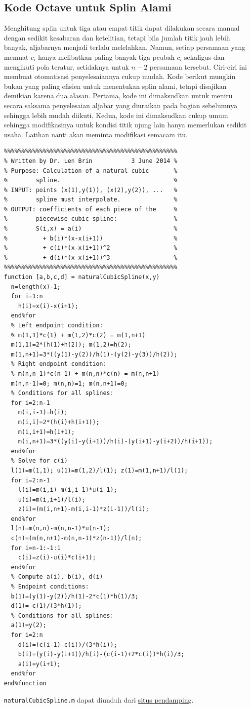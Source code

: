 \subsection{Kode Octave untuk Splin Alami}

Menghitung splin untuk tiga atau empat titik dapat dilakukan secara
manual dengan sedikit kesabaran dan ketelitian, tetapi bila jumlah
titik jauh lebih banyak, aljabarnya menjadi terlalu melelahkan. Namun,
setiap persamaan yang memuat $c_{i}$ hanya melibatkan paling banyak
tiga peubah $c_{i}$ sekaligus dan mengikuti pola teratur, setidaknya
untuk $n-2$ persamaan tersebut. Ciri-ciri ini membuat otomatisasi
penyelesaiannya cukup mudah. Kode berikut mungkin bukan yang paling
efisien untuk menentukan splin alami, tetapi disajikan demikian karena
dua alasan. Pertama, kode ini dimaksudkan untuk meniru secara saksama
penyelesaian aljabar yang diuraikan pada bagian sebelumnya sehingga
lebih mudah diikuti. Kedua, kode ini dimaksudkan cukup umum sehingga
modifikasinya untuk kondisi titik ujung lain hanya memerlukan sedikit
usaha. Latihan nanti akan meminta modifikasi semacam itu.

\noindent\begin{verbatim}
%%%%%%%%%%%%%%%%%%%%%%%%%%%%%%%%%%%%%%%%%%%%%%%%%
% Written by Dr. Len Brin           3 June 2014 %
% Purpose: Calculation of a natural cubic       %
%        spline.                                %
% INPUT: points (x(1),y(1)), (x(2),y(2)), ...   %
%        spline must interpolate.               %
% OUTPUT: coefficients of each piece of the     %
%        piecewise cubic spline:                %
%        S(i,x) = a(i)                          %
%          + b(i)*(x-x(i+1))                    %
%          + c(i)*(x-x(i+1))^2                  %
%          + d(i)*(x-x(i+1))^3                  %
%%%%%%%%%%%%%%%%%%%%%%%%%%%%%%%%%%%%%%%%%%%%%%%%%
function [a,b,c,d] = naturalCubicSpline(x,y)
  n=length(x)-1;
  for i=1:n
    h(i)=x(i)-x(i+1);
  end%for
  % Left endpoint condition:
  % m(1,1)*c(1) + m(1,2)*c(2) = m(1,n+1)
  m(1,1)=2*(h(1)+h(2)); m(1,2)=h(2);
  m(1,n+1)=3*((y(1)-y(2))/h(1)-(y(2)-y(3))/h(2));
  % Right endpoint condition:
  % m(n,n-1)*c(n-1) + m(n,n)*c(n) = m(n,n+1)
  m(n,n-1)=0; m(n,n)=1; m(n,n+1)=0;
  % Conditions for all splines:
  for i=2:n-1
    m(i,i-1)=h(i);
    m(i,i)=2*(h(i)+h(i+1));
    m(i,i+1)=h(i+1);
    m(i,n+1)=3*((y(i)-y(i+1))/h(i)-(y(i+1)-y(i+2))/h(i+1));
  end%for
  % Solve for c(i)
  l(1)=m(1,1); u(1)=m(1,2)/l(1); z(1)=m(1,n+1)/l(1);
  for i=2:n-1
    l(i)=m(i,i)-m(i,i-1)*u(i-1);
    u(i)=m(i,i+1)/l(i);
    z(i)=(m(i,n+1)-m(i,i-1)*z(i-1))/l(i);
  end%for
  l(n)=m(n,n)-m(n,n-1)*u(n-1);
  c(n)=(m(n,n+1)-m(n,n-1)*z(n-1))/l(n);
  for i=n-1:-1:1
    c(i)=z(i)-u(i)*c(i+1);
  end%for
  % Compute a(i), b(i), d(i)
  % Endpoint conditions:
  b(1)=(y(1)-y(2))/h(1)-2*c(1)*h(1)/3;
  d(1)=-c(1)/(3*h(1));
  % Conditions for all splines:
  a(1)=y(2);
  for i=2:n
    d(i)=(c(i-1)-c(i))/(3*h(i));
    b(i)=(y(i)-y(i+1))/h(i)-(c(i-1)+2*c(i))*h(i)/3;
    a(i)=y(i+1);
  end%for
end%function
\end{verbatim}\texttt{naturalCubicSpline.m} dapat diunduh dari \href{http://lqbrin.github.io/tea-time-numerical/ancillaries.html}{situs pendamping}.


